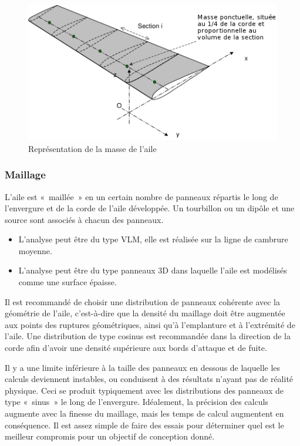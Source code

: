\documentclass[a4paper,twoside,12pt,dvips]{article}
\begin{document}
\begin{figure}[htbp]
	\centering
	\includegraphics[width=0.8\linewidth]{img-10-fr}
	\caption{Représentation de la masse de l’aile}
	\label{img:masse_aile}
\end{figure}

\subsubsection{Maillage}

L’aile est «~maillée~» en un certain nombre de panneaux répartis le long de l’envergure et de la corde de l’aile développée. Un tourbillon ou un dipôle et une source sont associés à chacun des panneaux.

\begin{itemize}
	\item L’analyse peut être du type VLM, elle est réalisée sur la ligne de 	
	cambrure moyenne.
	\item L’analyse peut être du type panneaux 3D dans laquelle l’aile est 
	modélisés comme une surface épaisse.
\end{itemize}

Il est recommandé de choisir une distribution de panneaux cohérente avec la géométrie de l’aile, c’est-à-dire que la densité du maillage doit être augmentée aux points des ruptures géométriques, ainsi qu’à l’emplanture et à l’extrémité de l’aile. Une distribution de type cosinus est recommandée dans la direction de
la corde afin d’avoir une densité supérieure aux bords d’attaque et de fuite.

Il y a une limite inférieure à la taille des panneaux en dessous de laquelle les calculs deviennent instables, ou conduisent à des résultats n’ayant pas de réalité physique. Ceci se produit typiquement avec les distributions des panneaux de type «~sinus~» le long de l’envergure. Idéalement, la précision des calculs augmente avec la finesse du maillage, mais les temps de calcul augmentent en conséquence. Il est assez simple de faire des essais pour déterminer quel est le meilleur compromis pour un objectif de conception donné.
\end{document}

